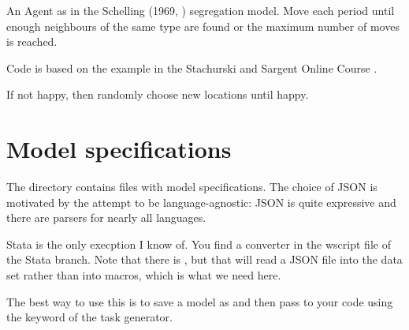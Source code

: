 \documentclass[a4paper,11pt,english]{sphinxmanual}
\begin{document}
\begin{fulllineitems}
\label{\detokenize{model_code:src.model_code.agent.Agent}}
An Agent as in the Schelling (1969, )
segregation model. Move each period until enough neighbours
of the same type are found or the maximum number of moves
is reached.

Code is based on the example in the Stachurski and Sargent
Online Course .

\begin{fulllineitems}
\label{\detokenize{model_code:src.model_code.agent.Agent.move_until_happy}}
If not happy, then randomly choose new locations until happy.

\end{fulllineitems}


\end{fulllineitems}



\chapter{Model specifications}
\label{\detokenize{model_specs:model-specifications}}\label{\detokenize{model_specs:id1}}\label{\detokenize{model_specs::doc}}
The directory  contains  files with model specifications. The choice of JSON is motivated by the attempt to be language-agnostic: JSON is quite expressive and there are parsers for nearly all languages. %
\begin{footnote}[1]\sphinxAtStartFootnote
Stata is the only execption I know of. You find a  converter in the wscript file of the Stata branch. Note that there is , but that will read a JSON file into the data set rather than into macros, which is what we need here.
%
\end{footnote}

The best way to use this is to save a model as  and then pass  to your code using the  keyword of the  task generator.
\begin{quote}
\end{quote}
\end{document}
